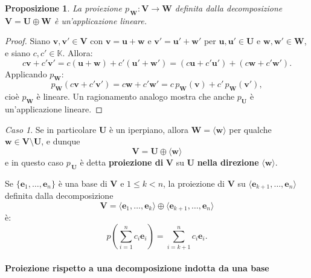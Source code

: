 \documentclass{article}
\theoremstyle{plain}
\newtheorem{prop}[thm]{Proposizione}
\theoremstyle{definition}
\theoremstyle{remark}
\newtheorem{case}{Caso}
\begin{document}
\begin{bxthm}
\begin{prop}
    La proiezione $p_{\,\mathbf{W}} : \mathbf{V} \to \mathbf{W}$ definita dalla decomposizione $\mathbf{V} = \mathbf{U} \oplus \mathbf{W}$ è un'applicazione lineare.
\end{prop}
\end{bxthm}                                                                                                     
\begin{proof}
Siano $\mathbf{v}, \mathbf{v}' \in \mathbf{V}$ con $\mathbf{v} = \mathbf{u} + \mathbf{w}$ e $\mathbf{v}' = \mathbf{u}' + \mathbf{w}'$ per $\mathbf{u}, \mathbf{u}' \in \mathbf{U}$ e $\mathbf{w}, \mathbf{w}' \in \mathbf{W}$, e siano $c, c' \in \mathbb{K}$. Allora:
\[
c\mathbf{v} + c'\mathbf{v}' = c(\mathbf{u} + \mathbf{w}) + c'(\mathbf{u}' + \mathbf{w}') = (c\mathbf{u} + c'\mathbf{u}') + (c\mathbf{w} + c'\mathbf{w}').
\]
Applicando $p_{\mathbf{W}}$:
\[
p_{\mathbf{W}}(c\mathbf{v} + c'\mathbf{v}') = c\mathbf{w} + c'\mathbf{w}' = c\,p_{\mathbf{W}}(\mathbf{v}) + c'\,p_{\mathbf{W}}(\mathbf{v}'),
\]
cioè $p_{\mathbf{W}}$ è lineare. Un ragionamento analogo mostra che anche $p_{\mathbf{U}}$ è un'applicazione lineare.
\end{proof}

\vspace{10pt}

\begin{case}
Se in particolare $\mathbf{U}$ è un iperpiano, allora $\mathbf{W}=\langle\mathbf{w}\rangle$ per qualche $\mathbf{w}\in\mathbf{V}\setminus\mathbf{U}$, e dunque 
\[\mathbf{V} =\mathbf{U}\oplus\langle\mathbf{w}\rangle\]
e in questo caso $p_{\,\mathbf{U}}$ è detta \textbf{proiezione di} $\mathbf{V}$ su $\mathbf{U}$ \textbf{nella direzione} $\langle\mathbf{w}\rangle$.     
\end{case}

\vspace{10pt}

Se $\{\mathbf{e}_1,\dots,\mathbf{e}_n\}$ è una base di $\mathbf{V}$ e $1\leq k<n$, la proiezione di $\mathbf{V}$ su $\langle\mathbf{e}_{k+1},\dots,\mathbf{e}_n\rangle$ 
definita dalla decomposizione \[\mathbf{V}=\langle\mathbf{e}_1,\dots,\mathbf{e}_k\rangle\oplus\langle\mathbf{e}_{k+1},\dots,\mathbf{e}_n\rangle\] è:
\[p\left(\sum_{i=1}^{n}c_i\mathbf{e}_i\right)=\sum_{i=k+1}^{n}c_i\mathbf{e}_i.\]
\paragraph{Proiezione rispetto a una decomposizione indotta da una base}
\end{document}
